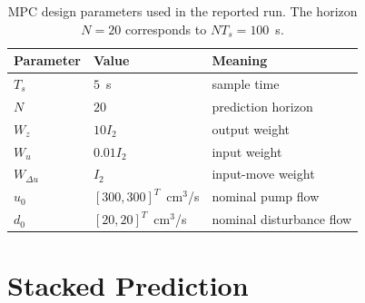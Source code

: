 \begin{table}[htbp]
 \centering
 \caption{MPC design parameters used in the reported run. The horizon
 $N=20$ corresponds to $NT_s=100$~s.}
 \label{tab:p8-design}
 \begin{tabular}{@{}lll@{}}
 \hline
 Parameter & Value & Meaning\\
 \hline
 $T_s$ & $5$~s & sample time\\
 $N$ & $20$ & prediction horizon\\
 $W_z$ & $10 I_2$ & output weight\\
 $W_u$ & $0.01 I_2$ & input weight\\
 $W_{\Delta u}$ & $I_2$ & input-move weight\\
 $u_0$ & $[300,300]^T$~cm$^3$/s & nominal pump flow\\
 $d_0$ & $[20,20]^T$~cm$^3$/s & nominal disturbance flow\\
 \hline
 \end{tabular}
\end{table}

\section{Stacked Prediction}
\label{sec:p8-prediction}

